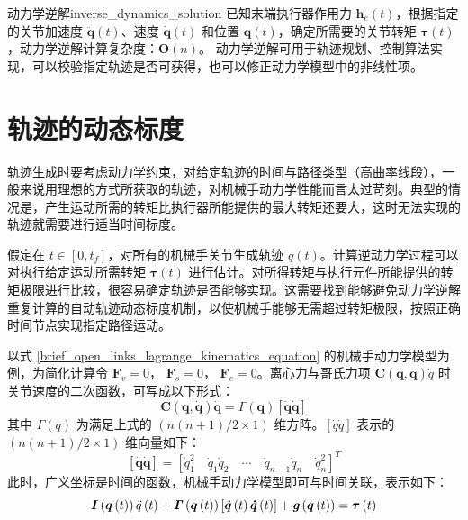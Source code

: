 \documentclass[cn,11pt,chinese,blue,bibstyle=ieeetr]{elegantbook}
\begin{document}
\begin{definition}{动力学逆解}{inverse_dynamics_solution}
已知末端执行器作用力 $\bm{h}_e(t)$，根据指定的关节加速度 $\bm{\ddot{q}}(t)$、速度 $\bm{\dot{q}}(t)$ 和位置 $\bm{q}(t)$，确定所需要的关节转矩 $\bm{\tau}(t)$，动力学逆解计算复杂度：$\bm{O}(n)$。
动力学逆解可用于轨迹规划、控制算法实现，可以校验指定轨迹是否可获得，也可以修正动力学模型中的非线性项。
\end{definition}


\section{轨迹的动态标度}

轨迹生成时要考虑动力学约束，对给定轨迹的时间与路径类型（高曲率线段），一般来说用理想的方式所获取的轨迹，对机械手动力学性能而言太过苛刻。典型的情况是，产生运动所需的转矩比执行器所能提供的最大转矩还要大，这时无法实现的轨迹就需要进行适当时间标度。

假定在 $t \in [0, t_f]$，对所有的机械手关节生成轨迹 $q(t)$。计算逆动力学过程可以对执行给定运动所需转矩 $\bm{\tau}(t)$ 进行估计。对所得转矩与执行元件所能提供的转矩极限进行比较，很容易确定轨迹是否能够实现。这需要找到能够避免动力学逆解重复计算的自动轨迹动态标度机制，以使机械手能够无需超过转矩极限，按照正确时间节点实现指定路径运动。

以式 \ref{brief_open_links_lagrange_kinematics_equation} 的机械手动力学模型为例，为简化计算令 $\bm{F}_v=0$， $\bm{F}_s=0$， $\bm{F}_e=0$。离心力与哥氏力项 $\bm{C}(\bm{q},\bm{\dot{q}})\dot{q}$ 时关节速度的二次函数，可写成以下形式：
\begin{equation}
\bm{C\left(q,\dot{q}\right)\dot{q} = \mathit{\Gamma} \left(q\right)[\dot{q}\dot{q}]} \nonumber
\end{equation}
其中 $\mathit{\Gamma} \left(q\right)$ 为满足上式的 $\left(n\left(n+1\right)/2 \times 1\right)$ 维方阵。$[\dot{q}\dot{q}]$ 表示的 $\left(n\left(n+1\right)/2 \times 1\right)$ 维向量如下：
\begin{equation}
\left[\bm{\dot{q}\dot{q}}\right] = [\dot{q}_1^2 \quad \dot{q}_1\dot{q}_2 \quad \cdots \quad \dot{q}_{n-1}\dot{q}_n \quad \dot{q}_n^2]^T \nonumber
\end{equation}
此时，广义坐标是时间的函数，机械手动力学模型即可与时间关联，表示如下：
\begin{equation}\label{dynamic_scaling_lagrange_kinematics_equation_1}
\bm{I}\left(\bm{q}\left(t\right)\right)\ddot{q}\left(t\right) + \bm{\mathit{\Gamma}}\left(\bm{q}\left(t\right)\right)\left[\bm{\dot{q}}\left(t\right)\bm{\dot{q}}\left(t\right)\right] + \textbf{\textit{g}}\left(\bm{q}\left(t\right)\right) = \bm{\tau}\left(t\right)
\end{equation}
\end{document}
